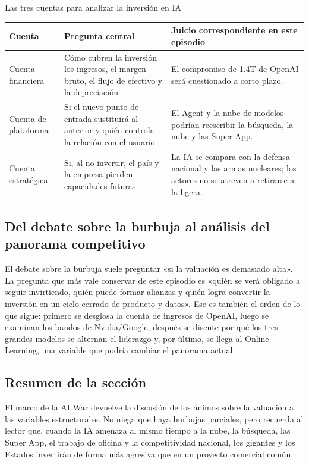 \begin{importantbox}{Las tres cuentas para analizar la inversión en IA}
\begin{tabularx}{\textwidth}{p{}p{}X}
\toprule
Cuenta & Pregunta central & Juicio correspondiente en este episodio \\
\midrule
Cuenta financiera & Cómo cubren la inversión los ingresos, el margen bruto, el flujo de efectivo y la depreciación & El compromiso de 1.4T de OpenAI será cuestionado a corto plazo. \\
Cuenta de plataforma & Si el nuevo punto de entrada sustituirá al anterior y quién controla la relación con el usuario & El Agent y la nube de modelos podrían reescribir la búsqueda, la nube y las Super App. \\
Cuenta estratégica & Si, al no invertir, el país y la empresa pierden capacidades futuras & La IA se compara con la defensa nacional y las armas nucleares; los actores no se atreven a retirarse a la ligera. \\
\bottomrule
\end{tabularx}
\end{importantbox}

\subsection{Del debate sobre la burbuja al análisis del panorama competitivo}

El debate sobre la burbuja suele preguntar «si la valuación es demasiado alta». La pregunta que más vale conservar de este episodio es «quién se verá obligado a seguir invirtiendo, quién puede formar alianzas y quién logra convertir la inversión en un ciclo cerrado de producto y datos». Ese es también el orden de lo que sigue: primero se desglosa la cuenta de ingresos de OpenAI, luego se examinan los bandos de Nvidia/Google, después se discute por qué los tres grandes modelos se alternan el liderazgo y, por último, se llega al Online Learning, una variable que podría cambiar el panorama actual.

\subsection{Resumen de la sección}

El marco de la AI War devuelve la discusión de los ánimos sobre la valuación a las variables estructurales. No niega que haya burbujas parciales, pero recuerda al lector que, cuando la IA amenaza al mismo tiempo a la nube, la búsqueda, las Super App, el trabajo de oficina y la competitividad nacional, los gigantes y los Estados invertirán de forma más agresiva que en un proyecto comercial común.
